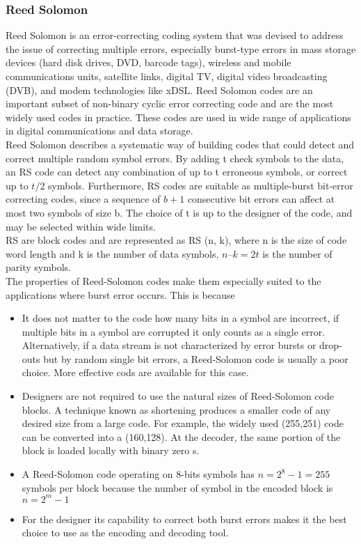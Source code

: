 \subsubsection{Reed Solomon}
Reed Solomon is an error-correcting coding system that was devised to address the issue of correcting multiple 
errors, especially burst-type errors in mass storage devices (hard disk drives, DVD, barcode tags), wireless and mobile 
communications units, satellite links, digital TV, digital video broadcasting (DVB), and modem technologies like xDSL. Reed Solomon codes are an important subset of non-binary cyclic error correcting code and are the most widely used codes in practice. These codes are  used in wide range of applications in digital communications and data  storage. \\
Reed Solomon describes a systematic  way of building codes that could detect and correct multiple random symbol errors. By adding t check symbols to the data, an RS code can detect any combination of up to t erroneous symbols, or correct up to $t/2$ symbols. Furthermore, RS codes are suitable as multiple-burst bit-error correcting codes, since a sequence of $b + 1$ consecutive bit errors can affect at most two symbols of size b. The choice of t  is up to the designer of the code, and may be selected within wide limits.\\
RS are  block codes and are  represented as RS (n, k),  where  n is the  size  of code  word length and k is the number of data symbols, $n – k = 2t$ is the number of parity symbols.\\
The properties of Reed-Solomon codes make them especially suited to the applications where burst error occurs. This is because
\begin{itemize}
    \item It does not matter to the code how many bits in a symbol are incorrect, if multiple bits in a symbol are corrupted it only counts as a single error. Alternatively, if a data stream is not characterized by error bursts or drop-outs but by random single bit errors, a Reed-Solomon code is usually a poor choice. More effective cods are available for this case.
    \item Designers are not required to use the natural sizes of Reed-Solomon code blocks. A technique known as shortening produces a smaller code of any desired size from a large code. For example, the widely used (255,251) code can be converted into a (160,128). At the decoder, the same portion of the block is loaded locally with binary zero
    s.
    \item A Reed-Solomon code operating on 8-bits symbols has $n=2^8-1 = 255$ symbols per block because the number of symbol in the encoded block is $n = 2^m-1$
    \item For the designer its capability to correct both burst errors makes it the best choice to use as the encoding and decoding tool.
\end{itemize}
\cite{ReedSolmon_ResearchPaper}
%
%
